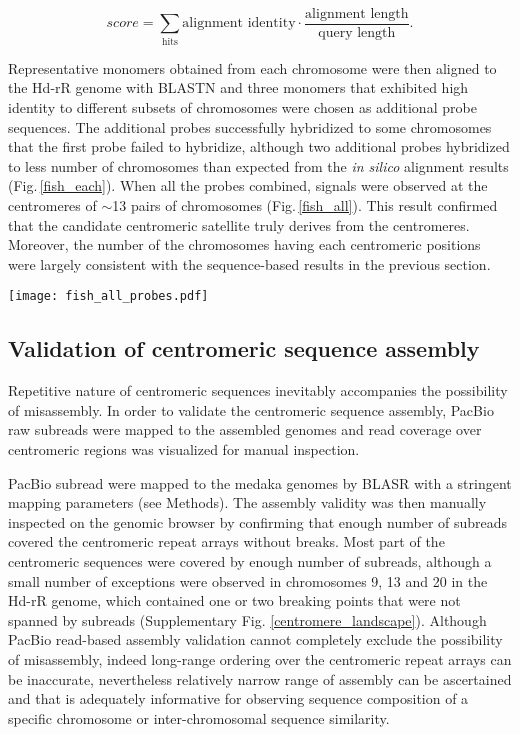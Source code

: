   \[
    score = \sum_{\mbox{hits}} \mbox{alignment identity} \cdot \frac{\mbox{alignment length}}{\mbox{query length}}.
  \]

  Representative monomers obtained from each chromosome were then aligned to the Hd-rR genome with BLASTN and three monomers that exhibited high identity to different subsets of chromosomes were chosen as additional probe sequences. The additional probes successfully hybridized to some chromosomes that the first probe failed to hybridize, although two additional probes hybridized to less number of chromosomes than expected from the \textit{in silico} alignment results (Fig.\,\ref{fish_each}). When all the probes combined, signals were observed at the centromeres of $\sim$13 pairs of chromosomes (Fig.\,\ref{fish_all}). This result confirmed that the candidate centromeric satellite truly derives from the centromeres. Moreover, the number of the chromosomes having each centromeric positions were largely consistent with the sequence-based results in the previous section.

  \begin{figure*}
    \centering
    \texttt{[image: fish\_all\_probes.pdf]}
    \caption{
      The candidate centromeric satellite sequence and three derivative sequences localized to the centromeres of $\sim$13 pairs of chromosomes. (left) DNA is stained with DAPI. (center) probes are stained green. (right) two images are combined.
    }
    \label{fish_all}
  \end{figure*}


\subsection*{Validation of centromeric sequence assembly}
  Repetitive nature of centromeric sequences inevitably accompanies the possibility of misassembly. In order to validate the centromeric sequence assembly, PacBio raw subreads were mapped to the assembled genomes and read coverage over centromeric regions was visualized for manual inspection.

  PacBio subread were mapped to the medaka genomes by BLASR \cite{Chaisson2012} with a stringent mapping parameters (see Methods). The assembly validity was then manually inspected on the genomic browser by confirming that enough number of subreads covered the centromeric repeat arrays without breaks. Most part of the centromeric sequences were covered by enough number of subreads, although a small number of exceptions were observed in chromosomes 9, 13 and 20 in the Hd-rR genome, which contained one or two breaking points that were not spanned by subreads (Supplementary Fig. \ref{centromere_landscape}). Although PacBio read-based assembly validation cannot completely exclude the possibility of misassembly, indeed long-range ordering over the centromeric repeat arrays can be inaccurate, nevertheless relatively narrow range of assembly can be ascertained and that is adequately informative for observing sequence composition of a specific chromosome or inter-chromosomal sequence similarity.


